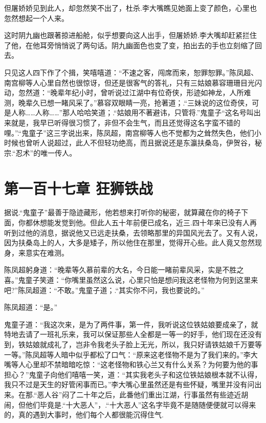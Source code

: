 \documentclass[12pt,oneside]{book}
\begin{document}
但屠娇娇见到此人，却忽然笑不出了，杜杀.李大嘴瞧见她面上变了颜色，心里也忽然想起一个人来。

这时阴九幽也跟著掠进船舱，似乎想要向这人出手，但屠娇娇.李大嘴却赶紧拦住了他，在他耳旁悄悄说了两句话。阴九幽面色也变了变，拍出去的手也立刻缩了回去。

只见这人四下作了个揖，笑嘻嘻道：``不速之客，闯席而来，恕罪恕罪。''陈凤超、南宫柳等人心里自然也很惊讶，但还是很客气的答礼，只有三姑娘慕容珊珊目光闪动，忽然道：``晚辈年纪小时，曾听说过江湖中有位奇侠，形迹如神龙，人所难测，晚辈久已想一睹风采了。''慕容双眼睛一亮，抢著道；.``三妹说的这位奇侠，可是人称\ldots\ldots 人称\ldots\ldots{}''那人哈哈笑道；.``姑娘用不著避讳，只管将.''鬼童子``这名号叫出来就是，我早已听得很习惯了，非但不会生气，而且还觉得这名字蛮不错的哩。''.``鬼童子''这三字说出来，陈凤超，南宫柳等人也不觉都为之耸然失色，他们小时候也曾听人说超过，此人不但轻功绝高，而且据说还是东瀛扶桑岛，伊贺谷，秘宗.``忍术''的唯一传人。

\hypertarget{ux7b2cux4e00ux767eux5341ux4e03ux7ae0-ux72c2ux72eeux94c1ux6218}{%
\chapter{第一百十七章
狂狮铁战}\label{ux7b2cux4e00ux767eux5341ux4e03ux7ae0-ux72c2ux72eeux94c1ux6218}}

据说.``鬼童子''最善于隐迹藏形，他若想来打听你的秘密，就算藏在你的椅子下面，你都休想能发觉到他。但此人五十年前便已成名，近三.四十年来已没有人再听到过他的消息，据说他又已远走扶桑，去领略那里的异国风光去了。又有人说，因为扶桑岛上的人，大多是矮子，所以他住在那里，觉得开心些。此人竟又忽然现身，来意实在难测。

陈凤超躬身道：``晚辈等久慕前辈的大名，今日能一睹前辈风采，实是不胜之喜。''鬼童子笑道：``你嘴里虽然这么说，心里只怕是想问我这老怪物为何到这里来吧?''陈凤超道：``不敢。''鬼童子道；.``其实你不问，我也要说的。''

陈凤超道：``是。''

鬼童子道：``我这次来，是为了两件事，第一件，我听说这位铁姑娘要成亲了，就特地去请了一班礼乐来，我可以保证那些人全都是一等一的好手，他们现在还没有到，铁姑娘就成礼了，岂非令我老头子脸上无光，所以，我只好请铁姑娘千万要等一等。''陈凤超等人暗中似乎都松了口气：``原来这老怪物不是为了我们来的。''李大嘴等人心里却不禁暗暗吃惊：``这老怪物和铁心兰又有什么关系？为何要为他的事担心？''鬼童子向他们嘻嘻一笑，道：``其实我老头子和这位铁姑娘根本就不认得，我只不过是天生的好管闲事而已。''李大嘴心里虽然还是有些怀疑，嘴里并没有问出来。在那.``恶人谷''闷了二十年之后，此番他们重出江湖，行事虽然有些迹近胡闹，但他们毕竟是.``十大恶人''，.``十大恶人''这名字毕竟不是随随便便就可以得来的，真的遇到大事时，他们每个人都很能沉得住气.
\end{document}
